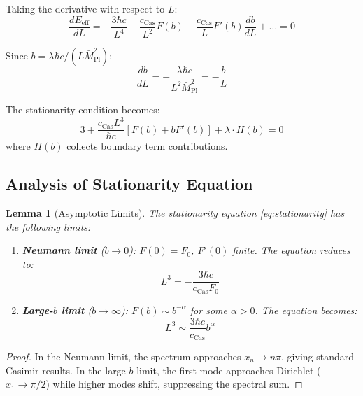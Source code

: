 \documentclass[11pt,a4paper]{article}
\newtheorem{lemma}[theorem]{Lemma}
\begin{document}
Taking the derivative with respect to $L$:
\begin{equation}
  \frac{dE_{\text{eff}}}{dL} = -\frac{3\hbar c}{L^4}
    - \frac{c_{\text{Cas}}}{L^2} F(b) + \frac{c_{\text{Cas}}}{L} F'(b) \frac{db}{dL}
    + \ldots = 0
  \label{eq:stationarity-raw}
\end{equation}

Since $b = \lambda \hbar c / (L \bar{M}_{\text{Pl}}^2)$:
\begin{equation}
  \frac{db}{dL} = -\frac{\lambda \hbar c}{L^2 \bar{M}_{\text{Pl}}^2} = -\frac{b}{L}
  \label{eq:db-dL}
\end{equation}

The stationarity condition becomes:
\begin{equation}
  \boxed{3 + \frac{c_{\text{Cas}} L^3}{\hbar c} \left[ F(b) + b F'(b) \right]
         + \lambda \cdot H(b) = 0}
  \label{eq:stationarity}
\end{equation}
where $H(b)$ collects boundary term contributions.

\subsection{Analysis of Stationarity Equation}

\begin{lemma}[Asymptotic Limits]
\label{lem:asymptotic}
The stationarity equation \eqref{eq:stationarity} has the following limits:
\begin{enumerate}
  \item \textbf{Neumann limit} ($b \to 0$): $F(0) = F_0$, $F'(0)$ finite.
        The equation reduces to:
        \begin{equation}
          L^3 = -\frac{3\hbar c}{c_{\text{Cas}} F_0}
          \label{eq:L-neumann-limit}
        \end{equation}
  \item \textbf{Large-$b$ limit} ($b \to \infty$): $F(b) \sim b^{-\alpha}$ for some $\alpha > 0$.
        The equation becomes:
        \begin{equation}
          L^3 \sim \frac{3\hbar c}{c_{\text{Cas}}} b^{\alpha}
          \label{eq:L-large-b}
        \end{equation}
\end{enumerate}
\end{lemma}

\begin{proof}
In the Neumann limit, the spectrum approaches $x_n \to n\pi$, giving standard
Casimir results. In the large-$b$ limit, the first mode approaches Dirichlet
($x_1 \to \pi/2$) while higher modes shift, suppressing the spectral sum.
\end{proof}
\end{document}
